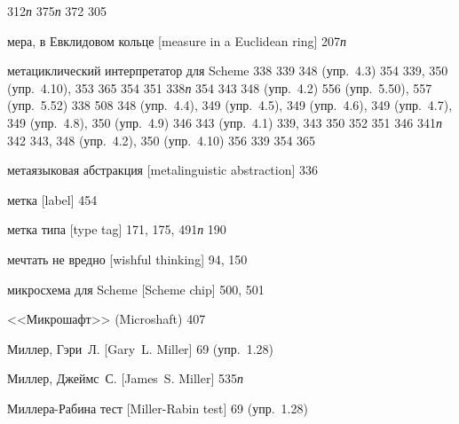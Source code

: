 \begin{theindex}
   312{\it п}
   375{\it п}
   372
   305
\item {мера, в Евклидовом кольце [measure in a Euclidean ring]} 207{\it п}
\item {метациклический интерпретатор для Scheme} 338
   339
   348 (упр.~4.3)
   354
   339, 350 (упр.~4.10), 353
   365
   354
   351
   338{\it п}
   354
   343
   348 (упр.~4.2)
   556 (упр.~5.50), 557 (упр.~5.52)
   338
   508
   348 (упр.~4.4), 349 (упр.~4.5), 349 (упр.~4.6), 349 (упр.~4.7), 349 (упр.~4.8), 350 (упр.~4.9)
   346
   343 (упр.~4.1)
   339, 343
   350
   352
   351
   346
   341{\it п}
   342
   343, 348 (упр.~4.2), 350 (упр.~4.10)
   356
   339
   354
   365
\item {метаязыковая абстракция [metalinguistic abstraction]} 336
\item {метка [label]} 454
\item {метка типа [type tag]} 171, 175, 491{\it п}
   190
\item {мечтать не вредно [wishful thinking]} 94, 150
\item {микросхема для Scheme [Scheme chip]} 500, 501
\item {<<Микрошафт>> (Microshaft)} 407
\item {Миллер, Гэри~Л. [Gary~L. Miller]} 69 (упр.~1.28)
\item {Миллер, Джеймс~С. [James~S. Miller]} 535{\it п}
\item {Миллера-Рабина тест [Miller-Rabin test]} 69 (упр.~1.28)

\end{theindex}
